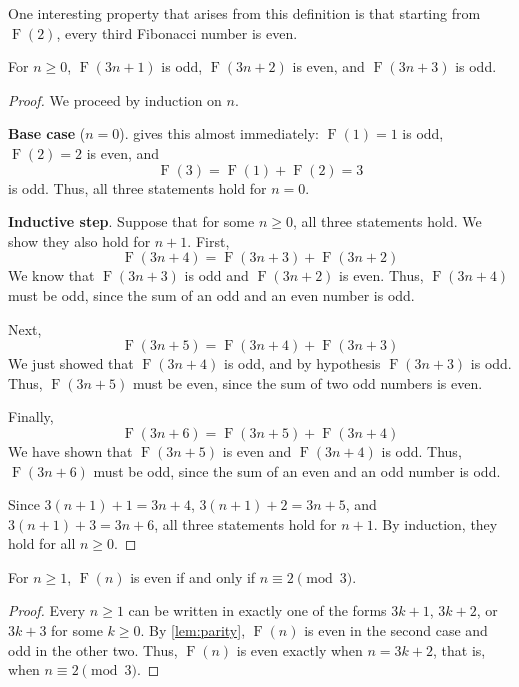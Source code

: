 \documentclass{article}
\begin{document}
One interesting property that arises from this definition is that starting from $\operatorname{F}(2)$, every third
Fibonacci number is even.
\begin{lemma}\label{lem:parity}
  For $n \ge 0$, $\operatorname{F}(3n + 1)$ is odd, $\operatorname{F}(3n + 2)$ is even, and $\operatorname{F}(3n + 3)$
  is odd.
\end{lemma}
\begin{proof}
  We proceed by induction on $n$.

  \textbf{Base case} ($n = 0$).
   gives this almost immediately: $\operatorname{F}(1) = 1$ is odd,
  $\operatorname{F}(2) = 2$ is even, and
  \[\operatorname{F}(3) = \operatorname{F}(1) + \operatorname{F}(2) = 3\] is odd.
  Thus, all three statements hold for $n=0$.

  \textbf{Inductive step}.
  Suppose that for some $n \ge 0$, all three statements hold. We show they also hold for $n+1$. First,
  \[\operatorname{F}(3n + 4) = \operatorname{F}(3n+3) + \operatorname{F}(3n+2)\]
  We know that $\operatorname{F}(3n + 3)$ is odd and $\operatorname{F}(3n+2)$ is even. Thus, $\operatorname{F}(3n + 4)$
  must be odd, since the sum of an odd and an even number is odd.

  Next,
  \[\operatorname{F}(3n + 5) = \operatorname{F}(3n+4) + \operatorname{F}(3n+3)\]
  We just showed that $\operatorname{F}(3n + 4)$ is odd, and by hypothesis $\operatorname{F}(3n+3)$ is odd. Thus,
  $\operatorname{F}(3n + 5)$ must be even, since the sum of two odd numbers is even.

  Finally,
  \[\operatorname{F}(3n + 6) = \operatorname{F}(3n+5) + \operatorname{F}(3n+4)\]
  We have shown that $\operatorname{F}(3n + 5)$ is even and $\operatorname{F}(3n+4)$ is odd. Thus,
  $\operatorname{F}(3n + 6)$ must be odd, since the sum of an even and an odd number is odd.

  Since $3(n+1) + 1 = 3n + 4$, $3(n+1) + 2 = 3n + 5$, and $3(n+1) + 3 = 3n + 6$, all three statements hold for $n + 1$.
  By induction, they hold for all $n \ge 0$.
\end{proof}

\begin{corollary}\label{cor:even}
  For $n \ge 1$, $\operatorname{F}(n)$ is even if and only if $n \equiv 2 \pmod{3}$.
\end{corollary}
\begin{proof}
  Every $n \ge 1$ can be written in exactly one of the forms $3k + 1$, $3k + 2$, or $3k + 3$ for some $k \ge 0$. By
  \cref{lem:parity}, $\operatorname{F}(n)$ is even in the second case and odd in the other two. Thus,
  $\operatorname{F}(n)$ is even exactly when $n = 3k + 2$, that is, when $n \equiv 2 \pmod{3}$.
\end{proof}
\end{document}
